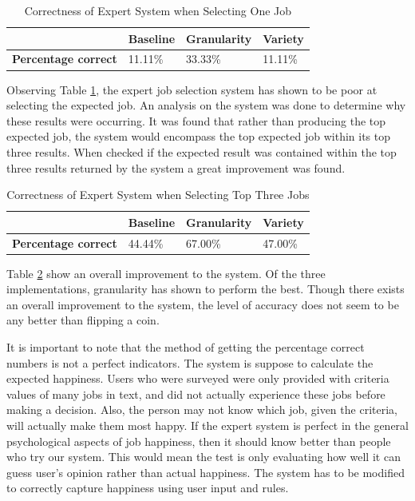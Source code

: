 \documentclass[12pt,fleqn,reqno,letterpaper]{article}
\begin{document}
\begin{table}[h]
  \caption{Correctness of Expert System when Selecting One Job}
    \label{tbl:INIT-RESULTS}
    \centering
\begin{tabular}{|l|l|l|l|}
\hline
                            & \textbf{Baseline} & \textbf{Granularity} & \textbf{Variety} \\ \hline
\textbf{Percentage correct} & 11.11\%           & 33.33\%              & 11.11\%          \\ \hline
\end{tabular}
\end{table}

Observing Table \ref{tbl:INIT-RESULTS}, the expert job selection system has shown to be poor at selecting the expected job.  An analysis on the system was done to determine why these results were occurring.  It was found that rather than producing the top expected job, the system would encompass the top expected job within its top three results.  When checked if the expected result was contained within the top three results returned by the system a great improvement was found.

\begin{table}[h]
  \caption{Correctness of Expert System when Selecting Top Three Jobs}
    \label{tbl:IMPROVE-RESULTS}
    \centering
\begin{tabular}{|l|l|l|l|}
\hline
                            & \textbf{Baseline} & \textbf{Granularity} & \textbf{Variety} \\ \hline
\textbf{Percentage correct} & 44.44\%           & 67.00\%              & 47.00\%          \\ \hline
\end{tabular}
\end{table}

Table \ref{tbl:IMPROVE-RESULTS} show an overall improvement to the system.  Of the three implementations, granularity has shown to perform the best.  Though there exists an overall improvement to the system, the level of accuracy does not seem to be any better than  flipping a coin.

It is important to note that the method of getting the percentage correct numbers is not a perfect indicators. The system is suppose to calculate the expected happiness. Users who were surveyed were only provided with criteria values of many jobs in text, and did not actually experience these jobs before making a decision. Also, the person may not know which job, given the criteria, will actually make them most happy. If the expert system is perfect in the general psychological aspects of job happiness, then it should know better than people who try our system. This would mean the test is only evaluating how well it can guess user’s opinion rather than actual happiness. The system has to be modified to correctly capture happiness using user input and rules.
\end{document}
